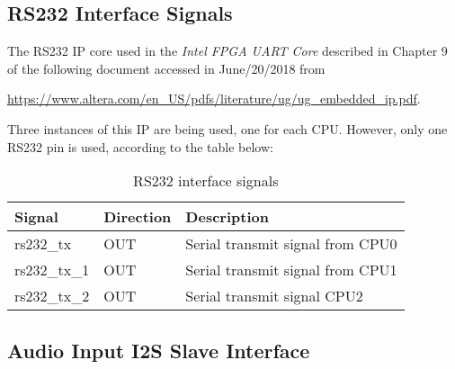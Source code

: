\documentclass{rep}
\theoremstyle{plain}
\begin{document}
\subsection{RS232 Interface Signals}

The RS232 IP core used in the {\it Intel FPGA UART Core} described in Chapter 9
of the following document accessed in June/20/2018 from

\hyperlink{https://www.altera.com/en\_US/pdfs/literature/ug/ug\_embedded\_ip.pdf}{https://www.altera.com/en\_US/pdfs/literature/ug/ug\_embedded\_ip.pdf}.

Three instances of this IP are being used, one for each CPU. However, only one
RS232 pin is used, according to the table below:

\begin{table}[H]
  \begin{center}
    \begin{tabular}{|l|l|p{8cm}|}
      \hline
      \rowcolor{iob-green}
      \textbf{Signal} & \textbf{Direction} & \textbf{Description} \\
      \hline
      \hline

      rs232\_tx &  OUT & Serial transmit signal from CPU0\\
      \hline

      rs232\_tx\_1 &  OUT & Serial transmit signal from CPU1\\
      \hline

      rs232\_tx\_2 &  OUT & Serial transmit signal CPU2\\
      \hline

    \end{tabular}
    \caption{RS232 interface signals}
    \label{tab:rs232}
  \end{center}
\end{table}
\clearpage

\subsection{Audio Input I2S Slave Interface}
\end{document}
